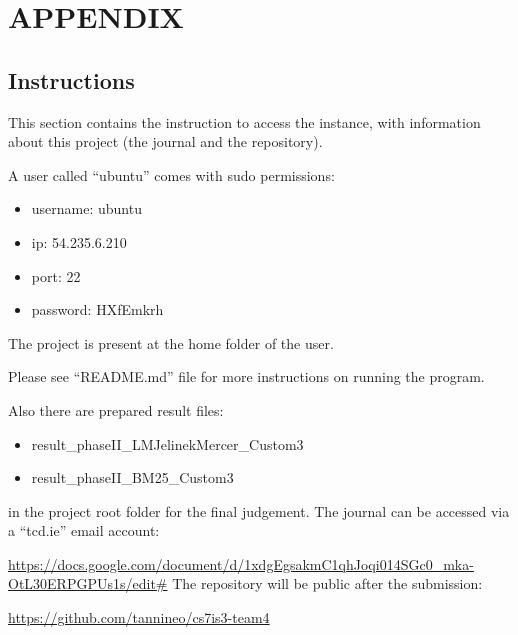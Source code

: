 \section{APPENDIX}
\subsection{Instructions}

This section contains the instruction to access the instance, with information about this project (the journal and the repository).

A user called \enquote{ubuntu} comes with sudo permissions:

\begin{itemize}
    \item username: ubuntu
    \item ip: 54.235.6.210
    \item port: 22
    \item password: HXfEmkrh
\end{itemize}

The project is present at the home folder of the user.

Please see \enquote{README.md} file for more instructions on running the program.

Also there are prepared result files:

\begin{itemize}
    \item result\_phaseII\_LMJelinekMercer\_Custom3
    \item result\_phaseII\_BM25\_Custom3
\end{itemize}

in the project root folder for the final judgement.
\vspace{2mm}
\newline
The journal can be accessed via a \enquote{tcd.ie} email account:

\url{https://docs.google.com/document/d/1xdgEgsakmC1qhJoqi014SGc0_mka-OtL30ERPGPUs1s/edit#}
\vspace{2mm}
\newline
The repository will be public after the submission:

\url{https://github.com/tannineo/cs7is3-team4}

